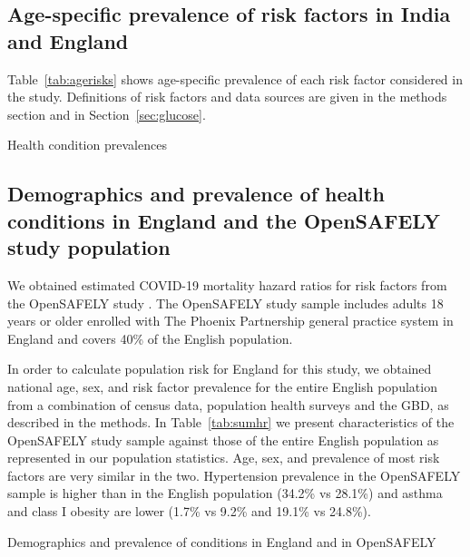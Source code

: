 \documentclass[10pt,letterpaper]{article}
\numberwithin{equation}{section}
\begin{document}
\subsection{Age-specific prevalence of risk factors in India and England}

Table~\ref{tab:agerisks} shows age-specific prevalence of each risk factor considered in the study. Definitions of risk factors and data sources are given in the methods section and in Section~\ref{sec:glucose}.

\begin{landscape}
  \begin{table}[H]
    \begin{center}
      \caption{Health condition prevalences}
      \label{tab:agerisks}
      
      
    \end{center}
  \end{table}
\end{landscape}

\clearpage
\subsection{Demographics and prevalence of health conditions in England and the OpenSAFELY study population}
We obtained estimated COVID-19 mortality hazard ratios for risk factors from the OpenSAFELY study \cite{williamson_opensafely_2020}. The OpenSAFELY study sample includes adults 18 years or older enrolled with The Phoenix Partnership general practice system in England and covers 40\% of the English population.

In order to calculate population risk for England for this study, we obtained national age, sex, and risk factor prevalence for the entire English population from a combination of census data, population health surveys and the GBD, as described in the methods. In Table~\ref{tab:sumhr} we present characteristics of the OpenSAFELY study sample against those of the entire English population as represented in our population statistics. Age, sex, and prevalence of most risk factors are very similar in the two. Hypertension prevalence in the OpenSAFELY sample is higher than in the English population (\num{34.2}\% vs \num{28.1}\%) and asthma and class I obesity are lower (\num{1.7}\% vs \num{9.2}\% and \num{19.1}\% vs \num{24.8}\%).


\begin{table}[H]
  \begin{center}
    \caption{Demographics and prevalence of conditions in England and in OpenSAFELY}
    \label{tab:sumhr}
    
    
  \end{center}
\end{table}
\end{document}
